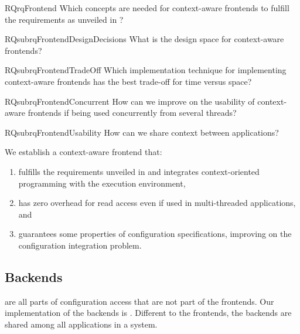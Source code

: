 \begin{restatable}{RQ}{rqFrontend}
 \label{rq:frontend-requirement}
 Which concepts are needed for context-aware frontends to fulfill the requirements as unveiled in ?
\end{restatable}

\begin{restatable}{RQsub}{rqFrontendDesignDecisions}
 \label{rq:frontend-design-decisions}
 What is the design space for context-aware frontends?
\end{restatable}

\begin{restatable}{RQsub}{rqFrontendTradeOff}
 \label{rq:frontend-trade-off}
Which implementation technique for implementing context-aware frontends has the best trade-off for time versus space?
\end{restatable}

\begin{restatable}{RQsub}{rqFrontendConcurrent}
 \label{rq:frontend-concurrent}
 How can we improve on the usability of context-aware frontends if being used concurrently from several threads?
\end{restatable}

\begin{restatable}{RQsub}{rqFrontendUsability}
 \label{rq:frontend-usability}
 How can we share context between applications?
\end{restatable}

\begin{contribution}
We establish a context-aware frontend that:
\begin{enumerate}
 \item fulfills the requirements unveiled in  and integrates context-oriented programming with the execution environment,
 \item has zero overhead for read access even if used in multi-threaded applications, and
 \item guarantees some properties of configuration specifications, improving on the configuration integration problem.
\end{enumerate}
\end{contribution}


\subsection{Backends}

 are all parts of configuration access that are not part of the frontends.
Our implementation of the backends is .
Different to the frontends, the backends are shared among all applications in a system.

